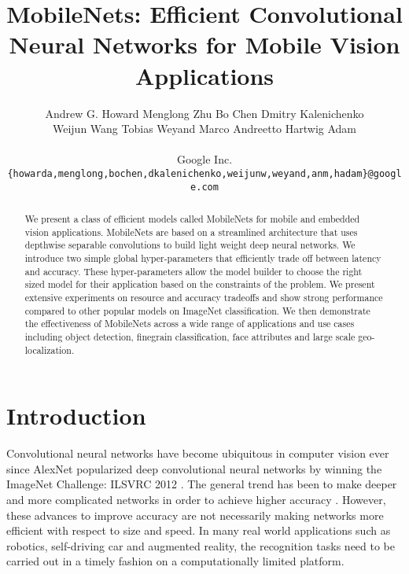 \documentclass[10pt,twocolumn,letterpaper]{article}
\begin{document}
\title{MobileNets: Efficient Convolutional Neural Networks for Mobile Vision Applications}

\author{Andrew G. Howard
\qquad
Menglong Zhu
\qquad
Bo Chen
\qquad
Dmitry Kalenichenko\\
Weijun Wang
\qquad
Tobias Weyand
\qquad
Marco Andreetto
\qquad
Hartwig Adam\\
\vspace{0.2em}\\
Google Inc.\\
{\tt\small \{howarda,menglong,bochen,dkalenichenko,weijunw,weyand,anm,hadam\}@google.com}
}

\maketitle


\begin{abstract}
   We present a class of efficient models called MobileNets for mobile and embedded vision applications. MobileNets are based on a streamlined architecture that uses depthwise separable convolutions to build light weight deep neural networks. We introduce two simple global hyper-parameters that efficiently trade off between latency and accuracy. These hyper-parameters allow the model builder to choose the right sized model for their application based on the constraints of the problem. We present extensive experiments on resource and accuracy tradeoffs and show strong performance compared to other popular models on ImageNet classification. We then demonstrate the effectiveness of MobileNets across a wide range of applications and use cases including object detection, finegrain classification, face attributes and large scale geo-localization.
\end{abstract}

\section{Introduction}

Convolutional neural networks have become ubiquitous in computer vision ever since AlexNet \cite{krizhevsky2012imagenet} popularized deep convolutional neural networks by winning the ImageNet Challenge: ILSVRC 2012 \cite{russakovsky2015imagenet}. The general trend has been to make deeper and more complicated networks in order to achieve higher accuracy \cite{simonyan2014very,szegedy2015rethinking,szegedy2016inception,he2015deep}. However, these advances to improve accuracy are not necessarily making networks more efficient with respect to size and speed. In many real world applications such as robotics, self-driving car and augmented reality, the recognition tasks need to be carried out in a timely fashion on a computationally limited platform.
\end{document}
